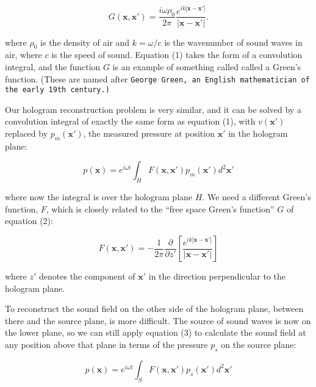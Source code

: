   \begin{equation*}G(\mathbf{x},\mathbf{x'})= \dfrac{i \omega \rho_0}{2 
  \pi}\dfrac{e^{i k |\mathbf{x}-\mathbf{x'}|}}{|\mathbf{x}-\mathbf{x'}|} . 
  \tag{2}\end{equation*} 

  \noindent{}where $\rho_0$ is the density of air and $k=\omega/c$ is the 
  wavenumber of sound waves in air, where $c$ is the speed of sound. Equation 
  (1) takes the form of a convolution integral, and the function $G$ is an 
  example of something called called a Green's function. (These are named after 
  \tt{}George Green\rm{}, an English mathematician of the early 19th century.) 

  Our hologram reconstruction problem is very similar, and it can be solved by 
  a convolution integral of exactly the same form as equation (1), with 
  $v(\mathbf{x'})$ replaced by $p_m(\mathbf{x'})$, the measured pressure at 
  position $\mathbf{x'}$ in the hologram plane: 

  \begin{equation*}p(\mathbf{x}) = e^{i \omega t} 
  \int_H{F(\mathbf{x},\mathbf{x'}) p_m(\mathbf{x'}) d^2 \mathbf{x'}} 
  \tag{3}\end{equation*} 

  \noindent{}where now the integral is over the hologram plane $H$. We need a 
  different Green's function, $F$, which is closely related to the ``free space 
  Green's function'' $G$ of equation (2): 

  \begin{equation*}F(\mathbf{x},\mathbf{x'})=- \dfrac{1}{2 \pi} 
  \dfrac{\partial}{\partial z'}\left[ \dfrac{e^{i k 
  |\mathbf{x}-\mathbf{x'}|}}{|\mathbf{x}-\mathbf{x'}|}\right] 
  \tag{4}\end{equation*} 

  \noindent{}where $z'$ denotes the component of $\mathbf{x'}$ in the direction 
  perpendicular to the hologram plane. 

  To reconstruct the sound field on the other side of the hologram plane, 
  between there and the source plane, is more difficult. The source of sound 
  waves is now on the lower plane, so we can still apply equation (3) to 
  calculate the sound field at any position above that plane in terms of the 
  pressure $p_s$ on the source plane: 

  \begin{equation*}p(\mathbf{x}) = e^{i \omega t} 
  \int_S{F(\mathbf{x},\mathbf{x'}) p_s(\mathbf{x'}) d^2 \mathbf{x'}} 
  \tag{5}\end{equation*} 

